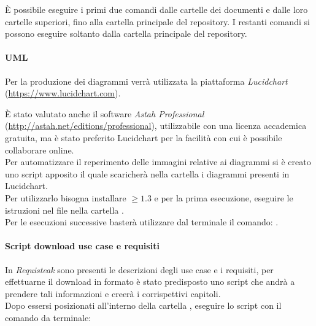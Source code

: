 È possibile eseguire i primi due comandi dalle cartelle dei documenti e dalle loro cartelle superiori, fino alla cartella principale del repository. I restanti comandi si possono eseguire soltanto dalla cartella principale del repository.

\paragraph{UML}
		
	Per la produzione dei diagrammi \emph{} verrà utilizzata la piattaforma \emph{Lucidchart}
	(\url{https://www.lucidchart.com}).
		
	È stato valutato anche il software \emph{Astah Professional} (\url{http://astah.net/editions/professional}), utilizzabile con
	una licenza accademica gratuita, ma è stato preferito Lucidchart per la facilità con cui è possibile collaborare online.\\
		
	Per automatizzare il reperimento delle immagini relative ai diagrammi  si è creato uno script apposito il quale
	scaricherà nella cartella  i diagrammi presenti in Lucidchart. \\
	Per utilizzarlo bisogna installare  $\geq 1.3$ e per la prima esecuzione, eseguire le istruzioni nel file
	 nella cartella . \\ 
	Per le esecuzioni successive basterà utilizzare dal terminale il comando: .
	
\paragraph{Script download use case e requisiti}
	In \emph{Requisteak} sono presenti le descrizioni degli use case e i requisiti, per effettuarne il download in formato
	 è stato predisposto uno script che andrà a prendere tali informazioni e creerà i corrispettivi capitoli.\\
	 Dopo essersi posizionati all'interno della cartella , eseguire lo script con il comando da terminale:
	  \\
	

